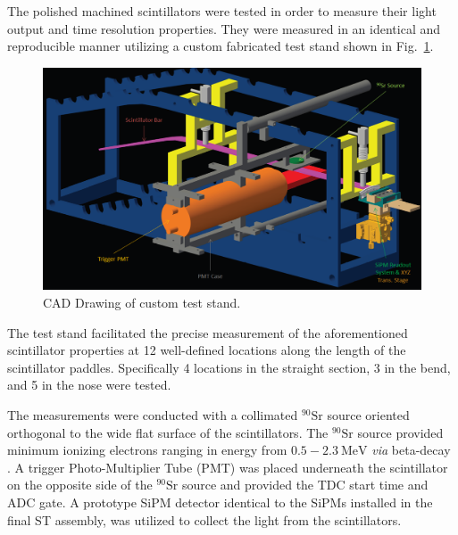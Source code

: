 The polished machined scintillators were tested in order to measure their light output and time resolution properties.  They were measured in an identical and reproducible manner utilizing a custom fabricated test stand shown in Fig.~\ref{fig:test_stand_model}. 
	\begin{figure}[!htb]
		\centering
		\includegraphics[width=1.0\columnwidth]{fabrication/figs/test_stand_model}
		\caption{CAD Drawing of custom test stand.}
		\label{fig:test_stand_model}
	\end{figure}
The test stand facilitated the precise measurement of the aforementioned scintillator properties at 12 well-defined locations along the length of the scintillator paddles.  Specifically 4 locations in the straight section, 3 in the bend, and 5 in the nose were tested.  

The measurements were conducted with a collimated $\mathrm{^{90}Sr}$ source oriented orthogonal to the wide flat surface of the scintillators.  The $\mathrm{^{90}Sr}$ source provided minimum ionizing electrons ranging in energy from $\mathrm{0.5-2.3~MeV}$ \textit{via} beta-decay \cite{nndc_sr90}\cite{nndc_y90}.  A trigger Photo-Multiplier Tube (PMT) was placed underneath the scintillator on the opposite side of the $\mathrm{^{90}Sr}$ source and provided the TDC start time and ADC gate.  A prototype SiPM detector identical to the SiPMs installed in the final ST assembly, was utilized to collect the light from the scintillators.  

